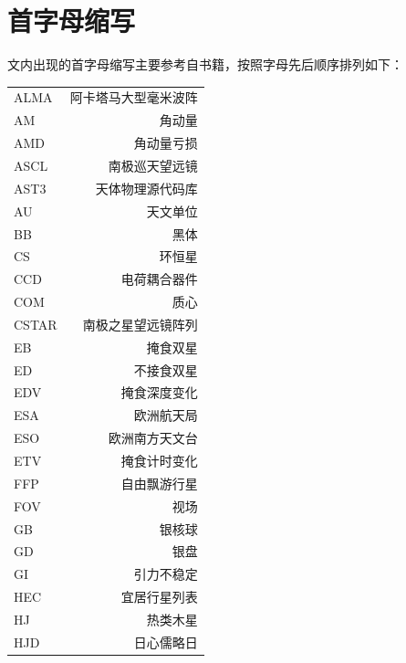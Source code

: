 \section{首字母缩写}  \label{apdx:acronym}
文内出现的首字母缩写主要参考自书籍，按照字母先后顺序排列如下：
\begin{multicols}{2}
\begin{tabularx}{0.85\linewidth}{@{\extracolsep{\fill}}lr}
\centering
ALMA		&   阿卡塔马大型毫米波阵		\\ 
AM			&   角动量					\\ 
AMD			&   角动量亏损				\\ 
ASCL		&   南极巡天望远镜			\\  
AST3		&   天体物理源代码库		\\  
AU			&   天文单位				\\
BB			&   黑体					\\
CS 			&   环恒星					\\
CCD			&   电荷耦合器件			\\
COM			&   质心					\\
CSTAR		&   南极之星望远镜阵列		\\  
EB			&   掩食双星				\\ 
ED			&   不接食双星				\\ 
EDV			&   掩食深度变化			\\
ESA 			&   欧洲航天局				\\
ESO 		&   欧洲南方天文台			\\
ETV			&   掩食计时变化			\\
FFP			&   自由飘游行星			\\ 
FOV			&   视场					\\ 
GB			&   银核球					\\
GD			&   银盘					\\
GI			&   引力不稳定				\\
HEC			&    宜居行星列表			\\
HJ			&   热类木星				\\
HJD			&   日心儒略日				
\end{tabularx}
\columnbreak


\end{multicols}
